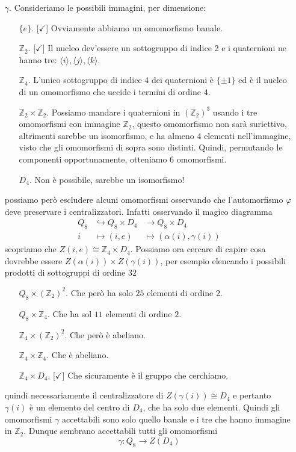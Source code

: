 \begin{multicols}{2}
\begin{itemize}
	 	\item [$ \gamma $.] Consideriamo le possibili immagini, per dimensione:
	 	\begin{itemize}
	 		\item [$\{e\}  $.][$ \checkmark $] Ovviamente abbiamo un omomorfismo banale.
	 		\item [$ \mathbb{Z}_2 $.][$ \checkmark $] Il nucleo dev'essere un sottogruppo di indice 2 e i quaternioni ne hanno tre: $ \langle i \rangle, \langle j \rangle, \langle k \rangle $.
	 		\item [$ \mathbb{Z}_4 $.] L'unico sottogruppo di indice $ 4 $ dei quaternioni è $ \{\pm 1\} $ ed è il nucleo di un omomorfismo che uccide i termini di ordine $ 4 $.
	 		\item [$ \mathbb{Z}_2\times\mathbb{Z}_2 $.] Possiamo mandare i quaternioni in $ \left(\mathbb{Z}_2\right)^3 $ usando i tre omomorfismi con immagine $ \mathbb{Z}_2 $, questo omomorfismo non sarà suriettivo, altrimenti sarebbe un isomorfismo, e ha almeno $ 4 $ elementi nell'immagine, visto che gli omomorfismi di sopra sono distinti. Quindi, permutando le componenti opportunamente, otteniamo $ 6 $ omomorfismi.
	 		\item [$ D_4 $.] Non è possibile, sarebbe un isomorfismo!
	 	\end{itemize}
	 	possiamo però escludere alcuni omomorfismi osservando che l'automorfismo $ \varphi $ deve preservare i centralizzatori. Infatti osservando il magico diagramma
	 	\begin{align*}
	 		Q_8 &\hookrightarrow Q_8 \times D_4 &\rightarrow Q_8 \times D_4 \\
	 		i &\mapsto (i, e) &\mapsto (\alpha(i), \gamma(i))
	 	\end{align*}
		 scopriamo che $ Z(i, e) \cong \mathbb{Z}_4 \times D_4 $. Possiamo ora cercare di capire cosa dovrebbe essere $ Z(\alpha(i))\times Z(\gamma(i)) $, per esempio elencando i possibili prodotti di sottogruppi di ordine $ 32 $
		 \begin{itemize}
		 	\item [$ Q_8 \times \left(\mathbb{Z}_2\right)^2 $.]
		 	Che però ha solo $ 25 $ elementi di ordine $ 2 $.
		 	\item [$ Q_8 \times \mathbb{Z}_4 $.]
		 	Che ha sol $ 11 $ elementi di ordine $ 2 $.
		 	\item [$ \mathbb{Z}_4 \times \left(\mathbb{Z}_2\right)^2 $.] Che però è abeliano.
		 	\item [$ \mathbb{Z}_4 \times \mathbb{Z}_4 $.] Che è abeliano.
		 	\item [$ \mathbb{Z}_4 \times D_4$.][$ \checkmark $] Che sicuramente è il gruppo che cerchiamo.
		 \end{itemize}
	 quindi necessariamente il centralizzatore di $ Z(\gamma(i)) \cong D_4 $ e pertanto $ \gamma(i) $ è un elemento del centro di $ D_4 $, che ha solo due elementi. Quindi gli omomorfismi $ \gamma $ accettabili sono solo quello banale e i tre che hanno immagine in $ \mathbb{Z}_2 $. Dunque sembrano accettabili tutti gli omomorfismi
	 \[ \boxed{\gamma: Q_8 \to Z(D_4)} \]
	 

\end{itemize}
\end{multicols}
